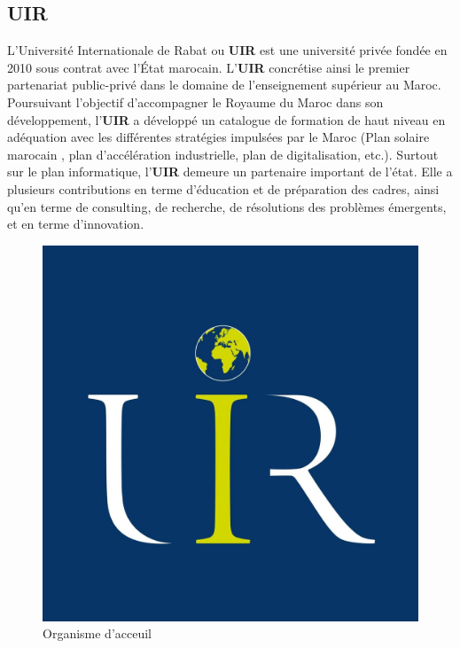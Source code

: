 \documentclass[a4paper]{report}
\begin{document}
\begin{doublespace}
    \subsection{UIR}
    L’Université Internationale de Rabat ou \textbf{UIR} est une université
    privée fondée en 2010 sous contrat avec l’État marocain.
    L'\textbf{UIR} concrétise ainsi le premier partenariat public-privé dans le
    domaine de l'enseignement supérieur au Maroc.
    Poursuivant l'objectif d'accompagner le Royaume du Maroc dans son
    développement, l'\textbf{UIR} a développé un catalogue
    de formation de haut niveau en adéquation avec les différentes stratégies
    impulsées par le Maroc (Plan solaire marocain
    , plan d'accélération industrielle, plan de digitalisation, etc.). Surtout
    sur le plan informatique, l'\textbf{UIR} demeure
    un partenaire important de l'état. Elle a plusieurs contributions en terme
    d'éducation et de préparation des cadres, ainsi
    qu'en terme de consulting, de recherche, de résolutions des problèmes
    émergents, et en terme d’innovation.
    \begin{figure}[H]
        \begin{center}
            \includegraphics[scale=0.1]{images/logo-uir.jpg}
            \caption{Organisme d'acceuil}
        \end{center}
    \end{figure}

\end{doublespace}
\end{document}

